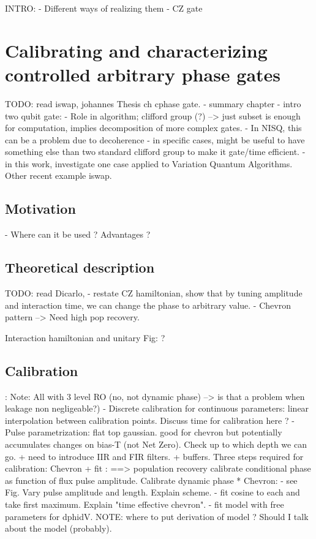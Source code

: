 INTRO: 
	- Different ways of realizing them
	- CZ gate


\chapter{Calibrating and characterizing controlled arbitrary phase gates}
TODO: read iswap, johannes Thesis ch cphase gate.
- summary chapter
- intro two qubit gate: 
	- Role in algorithm; clifford group (?)  --> just subset is enough for computation, implies decomposition of more complex gates. 
	- In NISQ, this can be a problem due to decoherence
- in specific cases, might be useful to have something else than two standard clifford group to make it gate/time efficient. 
- in this work, investigate one case applied to Variation Quantum Algorithms. Other recent example iswap.

\section{Motivation}
- 
Where can it be used ?
Advantages ?
\section{Theoretical description}
TODO: read Dicarlo, 
- restate CZ hamiltonian, show that by tuning amplitude and interaction time, we can change the phase to arbitrary value. 
- Chevron pattern --> Need high pop recovery.

Interaction hamiltonian and unitary
Fig: ?
\section{Calibration}: Note: All with 3 level RO (no, not dynamic phase) --> is that a problem when leakage non negligeable?)
- Discrete calibration for continuous parameters: linear interpolation between calibration points. Discuss time for calibration here ?
- Pulse parametrization: flat top gaussian. good for chevron but potentially accumulates changes on bias-T (not Net Zero). 
 Check up to which depth we can go. + need to introduce IIR and FIR filters. + buffers.
 Three steps required for calibration:
 Chevron + fit : ==> population recovery
 calibrate conditional phase as function of flux pulse amplitude. 
 Calibrate dynamic phase 
 * Chevron:
- see Fig. Vary pulse amplitude and length. Explain scheme.
- fit cosine to each and take first maximum. Explain "time effective chevron". 
- fit model with free parameters for dphidV. NOTE: where to put derivation of model ? Should I talk about the model (probably).

